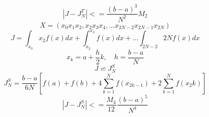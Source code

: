 \begin{equation}
	|J-J^T_N| <= \frac{(b-a)^3}{N^2}M_2
\end{equation}
\begin{equation}
	X = (x_0 x_1 x_2, x_2 x_3 x_4, \dots x_{2N-2}x_{2N-1}x_{2N})
\end{equation}
\begin{equation}
	J=\int_{x_0}{x_2}f(x)dx + \int_{x_2}^{x_4}f(x)dx + \dots \int_{2N-2}{2N}f(x)dx
\end{equation}
\begin{equation}
	x_k = a + \frac{h}{2}k, \quad h=\frac{b-a}{N}
\end{equation}
\begin{equation}
	J \backsimeq J_N^S
\end{equation}
\begin{equation}
	J_N^S = \frac{b-a}{6N}[f(a) + f(b) + 4\sum_{k=1}^{N}f(x_{2k-1}) + 2\sum_{k=1}^{N}f(x_2k)]
\end{equation}
\begin{equation}
	|J-J^S_N| <= \frac{M_4}{12}\frac{(b-a)^5}{N^4}
\end{equation}